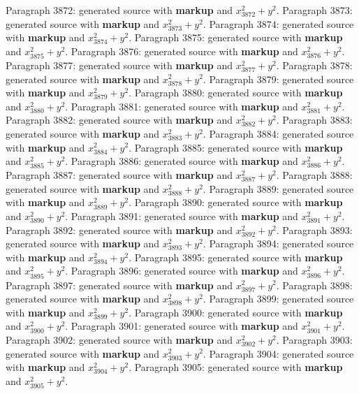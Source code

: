 \documentclass{article}
\begin{document}
Paragraph 3872: generated source with \textbf{markup} and $x_{3872}^2 + y^2$.
Paragraph 3873: generated source with \textbf{markup} and $x_{3873}^2 + y^2$.
Paragraph 3874: generated source with \textbf{markup} and $x_{3874}^2 + y^2$.
Paragraph 3875: generated source with \textbf{markup} and $x_{3875}^2 + y^2$.
Paragraph 3876: generated source with \textbf{markup} and $x_{3876}^2 + y^2$.
Paragraph 3877: generated source with \textbf{markup} and $x_{3877}^2 + y^2$.
Paragraph 3878: generated source with \textbf{markup} and $x_{3878}^2 + y^2$.
Paragraph 3879: generated source with \textbf{markup} and $x_{3879}^2 + y^2$.
Paragraph 3880: generated source with \textbf{markup} and $x_{3880}^2 + y^2$.
Paragraph 3881: generated source with \textbf{markup} and $x_{3881}^2 + y^2$.
Paragraph 3882: generated source with \textbf{markup} and $x_{3882}^2 + y^2$.
Paragraph 3883: generated source with \textbf{markup} and $x_{3883}^2 + y^2$.
Paragraph 3884: generated source with \textbf{markup} and $x_{3884}^2 + y^2$.
Paragraph 3885: generated source with \textbf{markup} and $x_{3885}^2 + y^2$.
Paragraph 3886: generated source with \textbf{markup} and $x_{3886}^2 + y^2$.
Paragraph 3887: generated source with \textbf{markup} and $x_{3887}^2 + y^2$.
Paragraph 3888: generated source with \textbf{markup} and $x_{3888}^2 + y^2$.
Paragraph 3889: generated source with \textbf{markup} and $x_{3889}^2 + y^2$.
Paragraph 3890: generated source with \textbf{markup} and $x_{3890}^2 + y^2$.
Paragraph 3891: generated source with \textbf{markup} and $x_{3891}^2 + y^2$.
Paragraph 3892: generated source with \textbf{markup} and $x_{3892}^2 + y^2$.
Paragraph 3893: generated source with \textbf{markup} and $x_{3893}^2 + y^2$.
Paragraph 3894: generated source with \textbf{markup} and $x_{3894}^2 + y^2$.
Paragraph 3895: generated source with \textbf{markup} and $x_{3895}^2 + y^2$.
Paragraph 3896: generated source with \textbf{markup} and $x_{3896}^2 + y^2$.
Paragraph 3897: generated source with \textbf{markup} and $x_{3897}^2 + y^2$.
Paragraph 3898: generated source with \textbf{markup} and $x_{3898}^2 + y^2$.
Paragraph 3899: generated source with \textbf{markup} and $x_{3899}^2 + y^2$.
Paragraph 3900: generated source with \textbf{markup} and $x_{3900}^2 + y^2$.
Paragraph 3901: generated source with \textbf{markup} and $x_{3901}^2 + y^2$.
Paragraph 3902: generated source with \textbf{markup} and $x_{3902}^2 + y^2$.
Paragraph 3903: generated source with \textbf{markup} and $x_{3903}^2 + y^2$.
Paragraph 3904: generated source with \textbf{markup} and $x_{3904}^2 + y^2$.
Paragraph 3905: generated source with \textbf{markup} and $x_{3905}^2 + y^2$.
\end{document}
